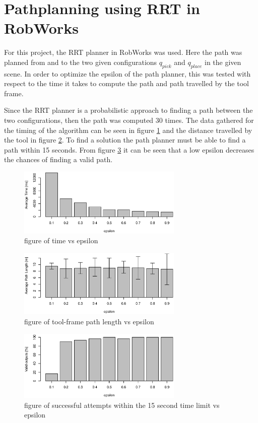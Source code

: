 \documentclass[12pt,a4paper]{article}
\begin{document}
\section{Pathplanning using RRT in RobWorks}
For this project, the RRT planner in RobWorks was used.
Here the path was planned from and to the two given configurations $q_{pick}$ and $q_{place}$ in the given scene.
In order to optimize the epsilon of the path planner, this was tested with respect to the time it takes to compute the path and path travelled by the tool frame.

Since the RRT planner is a probabilistic approach to finding a path between the two configurations, then the path was computed 30 times.
The data gathered for the timing of the algorithm can be seen in figure \ref{fig:timeVSepsilon} and the distance travelled by the tool in figure \ref{fig:distVSepsilon}.
To find a solution the path planner must be able to find a path within 15 seconds.
From figure \ref{fig:successfulVSepsilon} it can be seen that a low epsilon decreases the chances of finding a valid path.

\begin{figure}[H]
\centering
\includegraphics[width=0.7\textwidth]{../statistics/timeVSepsilon}
\caption{figure of time vs epsilon}
\label{fig:timeVSepsilon}
\end{figure}


\begin{figure}[H]
\centering
\includegraphics[width=0.7\textwidth]{../statistics/distVSepsilon}
\caption{figure of tool-frame path length vs epsilon}
\label{fig:distVSepsilon}
\end{figure}

\begin{figure}[H]
\centering
\includegraphics[width=0.7\textwidth]{../statistics/successfulVSepsilon}
\caption{figure of successful attempts within the 15 second time limit vs epsilon}
\label{fig:successfulVSepsilon}
\end{figure}
\end{document}
